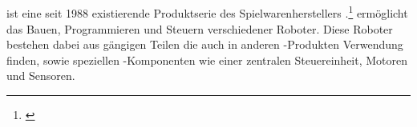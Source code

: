 \newpage
\subsection{\LM}
\LM{} ist eine seit 1988 existierende Produktserie des Spielwarenherstellers \LE{}.\footnote{\citep[vgl.][Das EV3 Roboter Universum, Seite 21]{Scholz.DasEV3}\label{note23}}
\LM{} ermöglicht das Bauen, Programmieren und Steuern verschiedener \LE{} Roboter. Diese Roboter bestehen dabei aus
gängigen \LE{} Teilen die auch in anderen \LE{}-Produkten Verwendung finden, sowie speziellen \LE{}-Komponenten 
wie einer zentralen Steuereinheit, Motoren und Sensoren.
